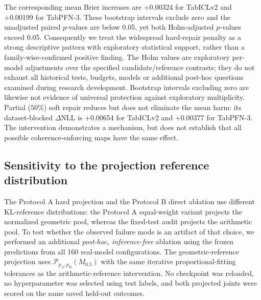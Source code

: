 \documentclass[a4paper,fleqn]{cas-sc}
\begin{document}
The corresponding mean Brier increases are +0.00324 for TabICLv2 and +0.00199 for TabPFN-3. These bootstrap intervals exclude zero and the unadjusted paired $p$-values are below 0.05, yet both Holm-adjusted $p$-values exceed 0.05. Consequently we treat the widespread hard-repair penalty as a strong descriptive pattern with exploratory statistical support, rather than a family-wise-confirmed positive finding. The Holm values are exploratory per-model adjustments over the specified candidate/reference contrasts; they do not exhaust all historical tests, budgets, models or additional post-hoc questions examined during research development. Bootstrap intervals excluding zero are likewise not evidence of universal protection against exploratory multiplicity. Partial ($50\%$) soft repair reduces but does not eliminate the mean harm: its dataset-blocked $\Delta$NLL is +0.00654 for TabICLv2 and +0.00377 for TabPFN-3. The intervention demonstrates a mechanism, but does not establish that all possible coherence-enforcing maps have the same effect.


\subsection{Sensitivity to the projection reference distribution}
\label{sec:projectionbridge}
The Protocol A hard projection and the Protocol B direct ablation use different KL-reference distributions: the Protocol A equal-weight variant projects the normalized geometric pool, whereas the fixed-test audit projects the arithmetic pool. To test whether the observed failure mode is an artifact of that choice, we performed an additional \emph{post-hoc, inference-free} ablation using the frozen predictions from all 160 real-model configurations. The geometric-reference projection uses $\mathcal{P}_{p_A,p_B}(M_{0.5})$ with the same iterative proportional-fitting tolerances as the arithmetic-reference intervention. No checkpoint was reloaded, no hyperparameter was selected using test labels, and both projected joints were scored on the same saved held-out outcomes.
\end{document}
